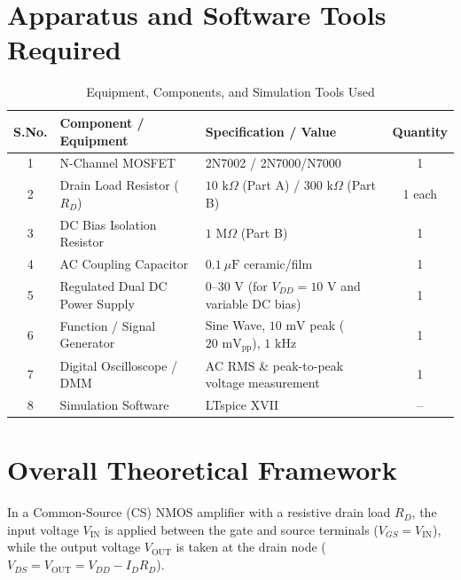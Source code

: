 \documentclass[11pt,a4paper]{article}
\begin{document}
\section{Apparatus and Software Tools Required}
\begin{table}[H]
\centering
\caption{Equipment, Components, and Simulation Tools Used}
\begin{tabular}{cp{4.5cm}p{6.8cm}c}
\toprule
\textbf{S.No.} & \textbf{Component / Equipment} & \textbf{Specification / Value} & \textbf{Quantity} \\
\midrule
1 & N-Channel MOSFET & 2N7002 / 2N7000/N7000 & 1 \\
2 & Drain Load Resistor ($R_D$) & $10\text{ k}\Omega$ (Part A) / $300\text{ k}\Omega$ (Part B) & 1 each \\
3 & DC Bias Isolation Resistor & $1\text{ M}\Omega$ (Part B) & 1 \\
4 & AC Coupling Capacitor & $0.1\ \mu\text{F}$ ceramic/film & 1 \\
5 & Regulated Dual DC Power Supply & $0\text{--}30\text{ V}$ (for $V_{DD} = 10\text{ V}$ and variable DC bias) & 1 \\
6 & Function / Signal Generator & Sine Wave, $10\text{ mV}$ peak ($20\text{ mV}_{\text{pp}}$), $1\text{ kHz}$ & 1 \\
7 & Digital Oscilloscope / DMM & AC RMS \& peak-to-peak voltage measurement & 1 \\
8 & Simulation Software & LTspice XVII & -- \\
\bottomrule
\end{tabular}
\end{table}

\section{Overall Theoretical Framework}
In a Common-Source (CS) NMOS amplifier with a resistive drain load $R_D$, the input voltage $V_{\text{IN}}$ is applied between the gate and source terminals ($V_{GS} = V_{\text{IN}}$), while the output voltage $V_{\text{OUT}}$ is taken at the drain node ($V_{DS} = V_{\text{OUT}} = V_{DD} - I_D R_D$).
\end{document}
